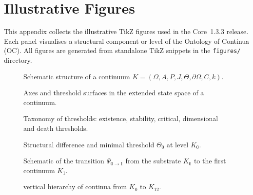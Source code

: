 
\section{Illustrative Figures}
\label{sec:figures}

This appendix collects the illustrative TikZ figures used in the Core~1.3.3
release. Each panel visualises a structural component or level of the
Ontology of Continua (OC). All figures are generated from standalone
TikZ snippets in the \texttt{figures/} directory.

\begin{figure}[p]
  \centering
  
  \caption{Schematic structure of a continuum
           \(K = (\Omega, A, P, J, \Theta, \partial\Omega, C, k)\).}
  \label{fig:continua-structure}
\end{figure}

\begin{figure}[p]
  \centering
  
  \caption{Axes and threshold surfaces in the extended state space of a
           continuum.}
  \label{fig:axes-thresholds}
\end{figure}

\begin{figure}[p]
  \centering
  
  \caption{Taxonomy of thresholds:
           existence, stability, critical, dimensional and death thresholds.}
  \label{fig:thresholds-taxonomy}
\end{figure}

\begin{figure}[p]
  \centering
  
  \caption{Structural difference and minimal threshold \texorpdfstring{\(\Theta_0\)}{\Theta_0} at level
           \texorpdfstring{\(K_0\)}{K_0}.}
  \label{fig:delta-threshold-k0}
\end{figure}

\begin{figure}[p]
  \centering
  
  \caption{Schematic of the transition \(\Psi_{0\to 1}\) from the substrate
           \(K_0\) to the first continuum \(K_1\).}
  \label{fig:k0-k1-transition}
\end{figure}

\begin{figure}[p]
  \centering
  
  \caption{vertical hierarchy of continua from \texorpdfstring{\(K_0\)}{K_0} to \texorpdfstring{\(K_{12}\)}{K12}.}
  \label{fig:levels-hierarchy}
\end{figure}

